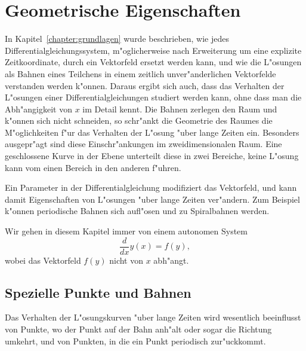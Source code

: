 %
%
%
\chapter{Geometrische Eigenschaften\label{chapter:geometrie}}
\lhead{}
In Kapitel~\ref{chapter:grundlagen} wurde beschrieben, wie jedes
Differentialgleichungssystem, m"oglicherweise nach Erweiterung um eine
explizite Zeitkoordinate, durch ein Vektorfeld ersetzt werden kann,
und wie die L"osungen als Bahnen eines Teilchens in einem zeitlich
unver"anderlichen Vektorfelde verstanden werden k"onnen.
Daraus ergibt sich auch, dass das Verhalten der L"osungen einer
Differentialgleichungen studiert werden kann, ohne dass man
die Abh"angigkeit von $x$ im Detail kennt.
Die Bahnen zerlegen den Raum und k"onnen sich nicht schneiden,
so schr"ankt die Geometrie des Raumes die M"oglichkeiten f"ur das
Verhalten der L"osung "uber lange Zeiten ein.
Besonders ausgepr"agt sind diese Einschr"ankungen im zweidimensionalen
Raum.
Eine geschlossene Kurve in der Ebene unterteilt diese in zwei Bereiche,
keine L"osung kann vom einen Bereich in den anderen f"uhren.

Ein Parameter in der Differentialgleichung modifiziert das Vektorfeld,
und kann damit Eigenschaften von L"osungen "uber lange Zeiten ver"andern.
Zum Beispiel k"onnen periodische Bahnen sich aufl"osen und zu Spiralbahnen
werden.

Wir gehen in diesem Kapitel immer von einem autonomen System
\[
\frac{d}{dx}y(x)=f(y),
\]
wobei das Vektorfeld $f(y)$ nicht von $x$ abh"angt.

%
%
\section{Spezielle Punkte und Bahnen}
Das Verhalten der L"osungskurven "uber lange Zeiten wird wesentlich
beeinflusst von Punkte, wo der Punkt auf der Bahn anh"alt oder sogar
die Richtung umkehrt, und von Punkten, in die ein Punkt periodisch
zur"uckkommt.

%
%
